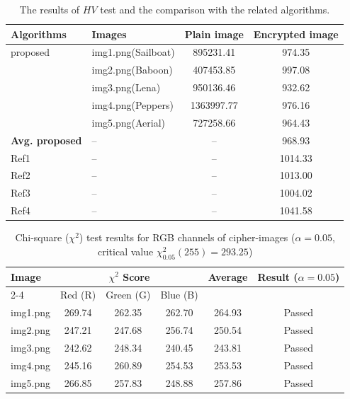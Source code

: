 \begin{table}[htbp]
\centering
\caption{The results of $HV$ test and the comparison with the related algorithms.}
\label{tab:hv_comparison}
\begin{tabular}{llcc}
\toprule
Algorithms & Images & Plain image & Encrypted image \\
\midrule
proposed               & img1.png(Sailboat) & 895231.41  & 974.35 \\
                       & img2.png(Baboon) & 407453.85  & 997.08  \\
                       & img3.png(Lena) & 950136.46  & 932.62 \\
                       & img4.png(Peppers) & 1363997.77 & 976.16  \\
                       & img5.png(Aerial) & 727258.66  & 964.43 \\
\textbf{Avg. proposed} & --       & --         & 968.93 \\
Ref1                   & --       & --         & 1014.33 \\
Ref2                   & --       & --         & 1013.00 \\
Ref3                   & --       & --         & 1004.02  \\
Ref4                   & --       & --         & 1041.58 \\
\bottomrule
\end{tabular}
\end{table}

\begin{table}[htbp]
\centering
\caption{Chi-square ($\chi^2$) test results for RGB channels of cipher-images ($\alpha = 0.05$, critical value $\chi_{0.05}^2(255) = 293.25$)}
\label{tab:chi_square}
\begin{tabular}{lccccc}
\toprule
\multirow{2}{*}{Image} & \multicolumn{3}{c}{$\chi^2$ Score} & \multirow{2}{*}{Average} & \multirow{2}{*}{Result ($\alpha = 0.05$)} \\
\cmidrule(lr){2-4}
 & Red (R) & Green (G) & Blue (B) & & \\
\midrule
img1.png & 269.74 & 262.35 & 262.70 & 264.93 & Passed \\
img2.png & 247.21 & 247.68 & 256.74 & 250.54 & Passed \\
img3.png & 242.62 & 248.34 & 240.45 & 243.81 & Passed \\
img4.png & 245.16 & 260.89 & 254.53 & 253.53 & Passed \\
img5.png & 266.85 & 257.83 & 248.88 & 257.86 & Passed \\
\bottomrule
\end{tabular}
\end{table}




